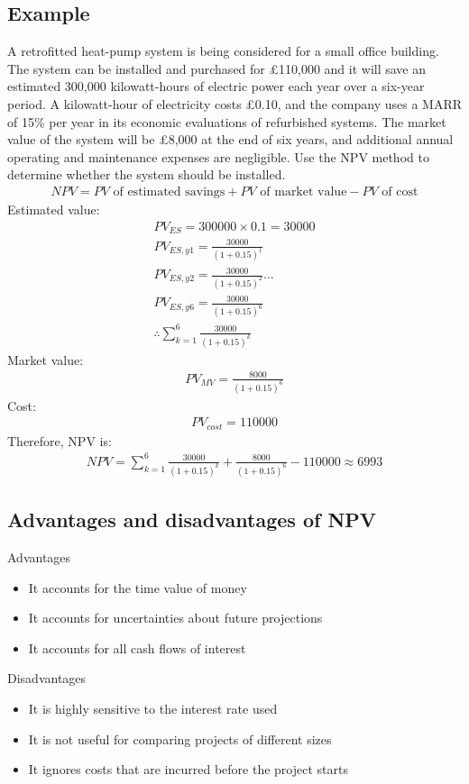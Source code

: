 \subsection{Example}
A retrofitted heat-pump system is being considered for a small office building. The system can be installed and purchased for £110,000 and it will save an estimated 300,000 kilowatt-hours of electric power each year over a six-year period. A kilowatt-hour of electricity costs £0.10, and the company uses a MARR of 15\% per year in its economic evaluations of refurbished systems. The market value of the system will be £8,000 at the end of six years, and additional annual operating and maintenance expenses are negligible. Use the NPV method to determine whether the system should be installed.
\begin{gather}
  NPV = PV\textrm{ of estimated savings} + PV\textrm{ of market value} -PV\textrm{ of cost}
\end{gather}
Estimated value:
\begin{gather}
  PV_{ES} = 300000\times 0.1 = 30000\\
  PV_{ES,y1} = \frac{30000}{(1+0.15)^1}\\
  PV_{ES,y2} = \frac{30000}{(1+0.15)^2}\dots\\
  PV_{ES,y6} = \frac{30000}{(1+0.15)^6} \\
  \therefore\sum_{k=1}^6\frac{30000}{(1+0.15)^k}
\end{gather}
Market value:
\begin{gather}
  PV_{MV} = \frac{8000}{(1+0.15)^6}
\end{gather}
Cost:
\begin{gather}
  PV_{cost} = 110000
\end{gather}
Therefore, NPV is:
\begin{gather}
  NPV = \sum_{k=1}^6\frac{30000}{(1+0.15)^k} +\frac{8000}{(1+0.15)^6} - 110000 \approx 6993
\end{gather}
\subsection{Advantages and disadvantages of NPV}
Advantages
\begin{itemize}
  \item It accounts for the time value of money
  \item It accounts for uncertainties about future projections
  \item It accounts for all cash flows of interest
\end{itemize}
Disadvantages
\begin{itemize}
  \item It is highly sensitive to the interest rate used
  \item It is not useful for comparing projects of different sizes
  \item It ignores costs that are incurred before the project starts
\end{itemize}
